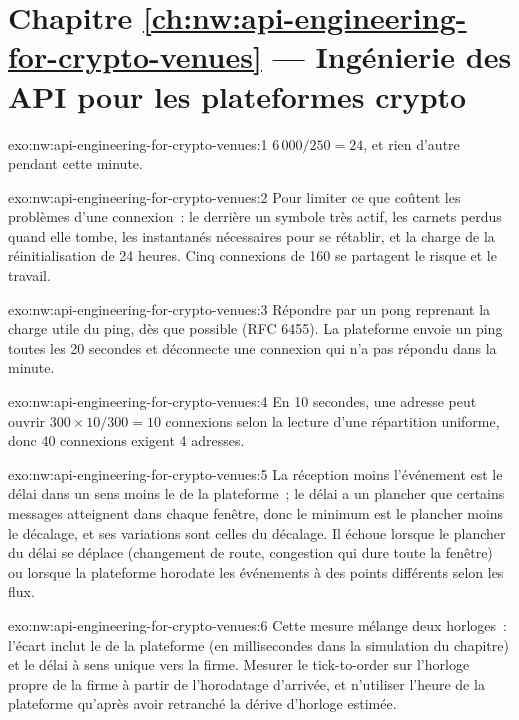 \section*{Chapitre \ref{ch:nw:api-engineering-for-crypto-venues} --- Ingénierie des API pour les plateformes crypto}

\begin{solution}{exo:nw:api-engineering-for-crypto-venues:1}
$6\,000/250 = 24$, et rien d'autre pendant cette minute.
\end{solution}

\begin{solution}{exo:nw:api-engineering-for-crypto-venues:2}
Pour limiter ce que coûtent les problèmes d'une connexion~: le  derrière un symbole très actif, les carnets perdus quand elle tombe, les instantanés nécessaires pour
se rétablir, et la charge de la réinitialisation de 24 heures. Cinq connexions de 160 se partagent le risque et le travail.
\end{solution}

\begin{solution}{exo:nw:api-engineering-for-crypto-venues:3}
Répondre par un pong reprenant la charge utile du ping, dès que possible (RFC 6455). La plateforme envoie un ping toutes les 20 secondes et déconnecte une connexion qui
n'a pas répondu dans la minute.
\end{solution}

\begin{solution}{exo:nw:api-engineering-for-crypto-venues:4}
En 10 secondes, une adresse peut ouvrir $300 \times 10/300 = 10$ connexions selon la lecture d'une répartition uniforme, donc 40 connexions exigent 4 adresses.
\end{solution}

\begin{solution}{exo:nw:api-engineering-for-crypto-venues:5}
La réception moins l'événement est le délai dans un sens moins le  de la plateforme~; le délai a un plancher que certains messages atteignent dans chaque fenêtre, donc le
minimum est le plancher moins le décalage, et ses variations sont celles du décalage. Il échoue lorsque le plancher du délai se déplace (changement de route, congestion qui dure toute la
fenêtre) ou lorsque la plateforme horodate les événements à des points différents selon les flux.
\end{solution}

\begin{solution}{exo:nw:api-engineering-for-crypto-venues:6}
Cette mesure mélange deux horloges~: l'écart inclut le  de la plateforme (en millisecondes dans la simulation du chapitre) et le délai à sens unique vers la firme.
Mesurer le tick-to-order sur l'horloge propre de la firme à partir de l'horodatage d'arrivée, et n'utiliser l'heure de la plateforme qu'après avoir retranché la dérive d'horloge estimée.
\end{solution}

